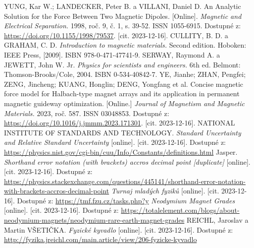 \documentclass[12pt, a4paper,
 twoside,        %
 openright
]{report}
\begin{document}
\begin{thebibliography}{99}
     YUNG, Kar W.; LANDECKER, Peter B. a VILLANI, Daniel D. An Analytic Solution for the Force Between Two Magnetic Dipoles. [Online]. \textit{Magnetic and Electrical Separation.} 1998, roč. 9, č. 1, s. 39-52. ISSN 1055-6915. Dostupné z: \url{https://doi.org/10.1155/1998/79537}. [cit. 2023-12-16].
     CULLITY, B. D. a GRAHAM, C. D. \textit{Introduction to magnetic materials.} Second edition. Hoboken: IEEE Press, [2009]. ISBN 978-0-471-47741-9.
     SERWAY, Raymond A. a JEWETT, John W. Jr. \textit{Physics for scientists and engineers.} 6th ed. Belmont: Thomson-Brooks/Cole, 2004. ISBN 0-534-40842-7.
     YE, Jianhe; ZHAN, Pengfei; ZENG, Jincheng; KUANG, Honglin; DENG, Yongfang et al. Concise magnetic force model for Halbach-type magnet arrays and its application in permanent magnetic guideway optimization. [Online.] \textit{Journal of Magnetism and Magnetic Materials.} 2023, roč. 587. ISSN 03048853. Dostupné z: \url{https://doi.org/10.1016/j.jmmm.2023.171301}. [cit. 2023-12-16].
     NATIONAL INSTITUTE OF STANDARDS AND TECHNOLOGY. \textit{Standard Uncertainty and Relative Standard Uncertainty} [online]. [cit. 2023-12-16]. Dostupné z: \url{https://physics.nist.gov/cgi-bin/cuu/Info/Constants/definitions.html}
     Jasper. \textit{Shorthand error notation (with brackets) accros decimal point [duplicate]} [online]. [cit. 2023-12-16]. Dostupné z: \url{https://physics.stackexchange.com/questions/445141/shorthand-error-notation-with-brackets-accros-decimal-point}
     \textit{Turnaj mladých fyziků} [online]. [cit. 2023-12-16]. Dostupné z: \url{https://tmf.fzu.cz/tasks.php?y}
     \textit{Neodymium Magnet Grades} [online]. [cit. 2023-12-16]. Dostupné z: \url{https://totalelement.com/blogs/about-neodymium-magnets/neodymium-rare-earth-magnet-grades}
     REICHL, Jaroslav a Martin VŠETIČKA. \textit{Fyzické kyvadlo} [online]. [cit. 2023-12-16]. Dostupné z: \url{http://fyzika.jreichl.com/main.article/view/206-fyzicke-kyvadlo}



\end{thebibliography}
\end{document}
